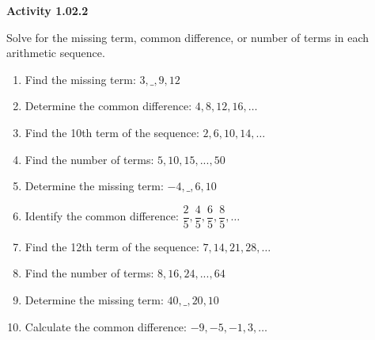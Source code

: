 \vspace{0.3ex}
\noindent\textbf{Activity 1.02.2}

\vspace{0.2ex}

Solve for the missing term, common difference, or number of terms in each arithmetic sequence.
\begin{enumerate}
    \item Find the missing term: $3, \_, 9, 12$
    \item Determine the common difference: $4, 8, 12, 16, \dots$
    \item Find the 10th term of the sequence: $2, 6, 10, 14, \dots$
    \item Find the number of terms: $5, 10, 15, ..., 50$
    \item Determine the missing term: $-4, \_, 6, 10$
    \item Identify the common difference: $\dfrac{2}{5}, \dfrac{4}{5}, \dfrac{6}{5}, \dfrac{8}{5}, \dots$
    \item Find the 12th term of the sequence: $7, 14, 21, 28, \dots$
    \item Find the number of terms: $8, 16, 24, ..., 64$
    \item Determine the missing term: $40, \_, 20, 10$
    \item Calculate the common difference: $-9, -5, -1, 3, \dots$
\end{enumerate}